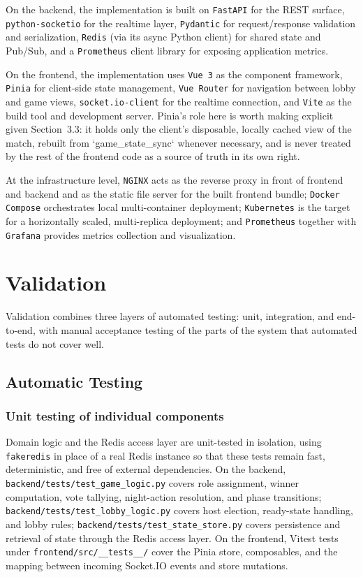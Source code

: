 \documentclass{scrartcl}
\begin{document}
On the backend, the implementation is built on \texttt{FastAPI} for the REST surface, \texttt{python-socketio} for the realtime layer, \texttt{Pydantic} for request/response validation and serialization, \texttt{Redis} (via its async Python client) for shared state and Pub/Sub, and a \texttt{Prometheus} client library for exposing application metrics.

On the frontend, the implementation uses \texttt{Vue 3} as the component framework, \texttt{Pinia} for client-side state management, \texttt{Vue Router} for navigation between lobby and game views, \texttt{socket.io-client} for the realtime connection, and \texttt{Vite} as the build tool and development server. Pinia's role here is worth making explicit given Section~3.3: it holds only the client's disposable, locally cached view of the match, rebuilt from `game\_state\_sync` whenever necessary, and is never treated by the rest of the frontend code as a source of truth in its own right.

At the infrastructure level, \texttt{NGINX} acts as the reverse proxy in front of frontend and backend and as the static file server for the built frontend bundle; \texttt{Docker Compose} orchestrates local multi-container deployment; \texttt{Kubernetes} is the target for a horizontally scaled, multi-replica deployment; and \texttt{Prometheus} together with \texttt{Grafana} provides metrics collection and visualization.

\section{Validation}\label{validation}

Validation combines three layers of automated testing: unit, integration, and end-to-end, with manual acceptance testing of the parts of the system that automated tests do not cover well.

\subsection{Automatic Testing}

\subsubsection{Unit testing of individual components}

Domain logic and the Redis access layer are unit-tested in isolation, using \texttt{fakeredis} in place of a real Redis instance so that these tests remain fast, deterministic, and free of external dependencies. On the backend, \texttt{backend/tests/test\_game\_logic.py} covers role assignment, winner computation, vote tallying, night-action resolution, and phase transitions; \texttt{backend/tests/test\_lobby\_logic.py} covers host election, ready-state handling, and lobby rules; \texttt{backend/tests/test\_state\_store.py} covers persistence and retrieval of state through the Redis access layer. On the frontend, Vitest tests under \texttt{frontend/src/\_\_tests\_\_/} cover the Pinia store, composables, and the mapping between incoming Socket.IO events and store mutations.
\end{document}

